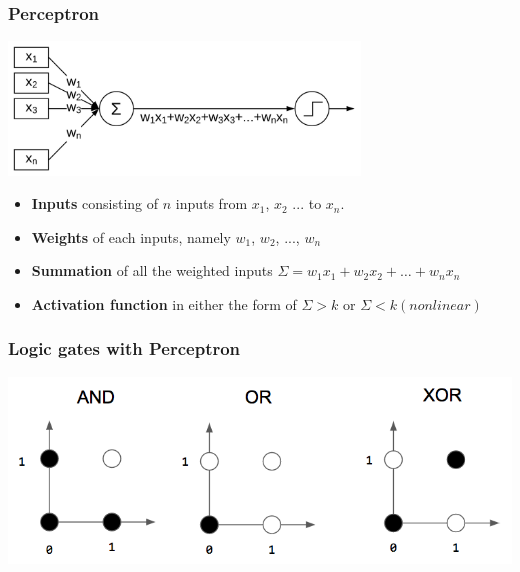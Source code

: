 \documentclass[aspectratio=169]{beamer}
\begin{document}
\begin{frame}
	\frametitle{Perceptron}
	\begin{center}
		\includegraphics[width=0.7\textwidth]{imgs/perceptron.pdf}
	\end{center}
	\begin{itemize}
		\item \textbf{Inputs} consisting of $n$ inputs from $x_1$, $x_2$ ... to $x_n$.
		\item \textbf{Weights} of each inputs, namely $w_1$, $w_2$, ..., $w_n$
		\item \textbf{Summation} of all the weighted inputs $\Sigma = w_1x_1 + w_2x_2 + \hdots + w_nx_n$
		\item \textbf{Activation function} in either the form of $\Sigma > k$ or  $\Sigma < k (nonlinear)$
	\end{itemize}
\end{frame}

\begin{frame}
	\frametitle{Logic gates with Perceptron}
	\begin{center}
		\includegraphics[width=0.7\linewidth,height=0.7\textheight,keepaspectratio]{imgs/gates.png}
	\end{center}
\end{frame}
\end{document}
